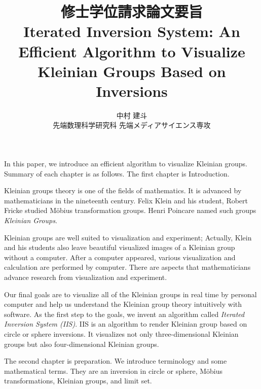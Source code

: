 \documentclass[uplatex, dvipdfmx]{article}
\title{修士学位請求論文要旨\\
 Iterated Inversion System: An Efficient Algorithm to Visualize Kleinian Groups Based on Inversions }
\author{中村 建斗\\
先端数理科学研究科 先端メディアサイエンス専攻\\
}
\date{}
\begin{document}
\maketitle
\pagestyle{plain}
\newpage

In this paper, we introduce an efficient algorithm to visualize Kleinian
groups. Summary of each chapter is as follows.
The first chapter is Introduction. 

Kleinian groups theory is one of the fields of mathematics.
It is advanced by mathematicians in the nineteenth century.
Felix Klein and his student, Robert Fricke studied M\"obius
transformation groups.
Henri Poincare named such groups \textit{Kleinian Groups}.

Kleinian groups are well suited to visualization and
experiment; Actually, Klein and his students also leave beautiful
visualized images of a Kleinian group without a computer.
After a computer appeared, various visualization and calculation are
performed by computer.
There are aspects that mathematicians advance research from
visualization and experiment.

Our final goals are to visualize all of the Kleinian groups in real time by
personal computer and help us understand the Kleinian group theory
intuitively with software.
As the first step to the goals, we invent an algorithm called
\textit{Iterated Inversion System (IIS)}.
IIS is an algorithm to render Kleinian group based on circle or sphere
inversions.
It visualizes not only three-dimensional Kleinian groups but also
four-dimensional Kleinian groups.

The second chapter is preparation.
We introduce terminology and some mathematical terms.
They are an inversion in circle or sphere, 
M\"obius transformations, Kleinian groups, and limit set.
\end{document}

